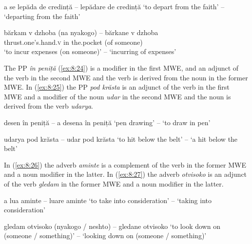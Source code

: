 \documentclass[output=paper]{langsci/langscibook}
\begin{document}
\begin{exe}
\ex \label{ex:8:22}
\settowidth{}
a se lepăda de credință – lepădare de credință 
‘to depart from the faith’ – ‘departing from the faith’
\end{exe}

\begin{exe}
\ex \label{ex:8:23}
\settowidth{}
\gll bărkam v dzhoba (na nyakogo) – bărkane v dzhoba \\
{thrust.one’s.hand}.\textsc{v} in the.pocket (of someone) \\ 
\glt‘to incur expenses (on someone)’ – `incurring of expenses’
\end{exe}



The PP \textit{în peniță} (\ref{ex:8:24}) is a modifier in the first MWE, and an adjunct
of the verb in the second MWE and the verb is derived from the noun in
the former MWE. In (\ref{ex:8:25}) the PP \textit{pod krăsta} is an adjunct of the verb
in the first MWE and a modifier of the noun \textit{udar} in the second MWE
and the noun is derived from the verb \textit{udarya}.


\begin{exe}
\ex \label{ex:8:24}
\settowidth{}
desen în peniță  – a desena în peniță 
‘pen drawing’ – ‘to draw in pen’
\end{exe}

\begin{exe}
\ex \label{ex:8:25}
\settowidth{}
udarya pod krăsta – udar pod krăsta 
‘to hit below the belt’ – ‘a hit below the belt’
\end{exe}

In (\ref{ex:8:26}) the adverb \textit{aminte} is a complement of the verb in the former
MWE and a noun modifier in the latter. In (\ref{ex:8:27}) the adverb \textit{otvisoko} is
an adjunct of the verb \textit{gledam} in the former MWE and a noun modifier
in the latter. 

\begin{exe}
\ex \label{ex:8:26}
\settowidth{}
a lua aminte  – luare aminte 
‘to take into consideration’ – ‘taking into consideration’
\end{exe}

\begin{exe}
\ex \label{ex:8:27}
\settowidth{}
gledam otvisoko (nyakogo / neshto) – gledane otvisoko 
‘to look down on (someone / something)’ – ‘looking down on (someone / something)’
\end{exe}
\end{document}
